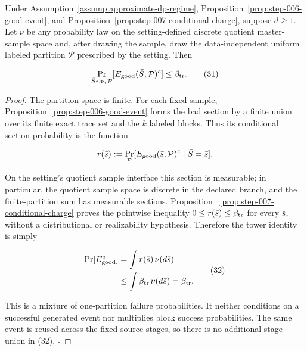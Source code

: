 \begin{proposition}\label{prop:step-007-tower}
Under Assumption~\ref{assump:approximate-dp-regime}, Proposition~\ref{prop:step-006-good-event}, and
Proposition~\ref{prop:step-007-conditional-charge}, suppose \(d\ge1\).
Let \(\nu\) be any probability law on the setting-defined discrete quotient
master-sample space and, after drawing the sample, draw the data-independent
uniform labeled partition \(\mathcal P\) prescribed by the setting. Then

\[
 \Pr_{\bar S\sim\nu,\,\mathcal P}
 [E_{\rm good}(\bar S,\mathcal P)^c]
 \le\beta_{\rm tr}.
\tag{31}
\]


\end{proposition}

\begin{proof}
The partition space is finite. For each fixed sample, Proposition~\ref{prop:step-006-good-event} forms the bad section by a finite
union over its finite exact trace set and the \(k\) labeled blocks. Thus its
conditional section probability is the function

\[
 r(\bar s):=
 \Pr_{\mathcal P}[E_{\rm good}(\bar s,\mathcal P)^c
 \mid\bar S=\bar s].
\]

On the setting's quotient sample interface this section is measurable; in
particular, the quotient sample space is discrete in the declared branch,
and the finite-partition sum has measurable sections. Proposition
~\ref{prop:step-007-conditional-charge} proves the pointwise inequality
\(0\le r(\bar s)\le\beta_{\rm tr}\) for every \(\bar s\), without a
distributional or realizability hypothesis. Therefore the tower identity
is simply

\[
\begin{aligned}
 \Pr[E_{\rm good}^c]
 &=\int r(\bar s)\,\nu(d\bar s)\\
 &\le\int\beta_{\rm tr}\,\nu(d\bar s)
 =\beta_{\rm tr}.
\end{aligned}
\tag{32}
\]

This is a mixture of one-partition failure probabilities. It neither
conditions on a successful generated event nor multiplies block success
probabilities. The same event is reused across the fixed source stages, so
there is no additional stage union in (32). \(\square\)


\end{proof}

